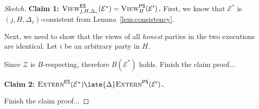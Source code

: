 \begin{proof}[Sketch]
  \noindent
  \textbf{Claim 1: $\textsc{View}^{\textsf{ES}}_{j,H,\Delta_v}(\mathcal{E}^*) = \textsc{View}^{\textsf{PS}}_H(\mathcal{E}')$.}
  First, we know that $\mathcal{E}^*$ is $(j, H, \Delta_v)$-consistent
  from Lemma~\ref{lem:consistency}.

  Next, we need to show
  that the views of all \emph{honest} parties in the two executions are identical. Let
  $i$ be an arbitrary party in $H$.

  Since $\mathcal{Z}$ is $B$-respecting, therefore $B(\mathcal{E}^*)$ holds.
  {\color{red} Finish the claim proof...}

  \noindent
  \textbf{Claim 2: $\LCExtern(\mathcal{E}^*) \late{\Delta} \PEExtern(\mathcal{E}')$.}

  {\color{red} Finish the claim proof...}
\end{proof}

